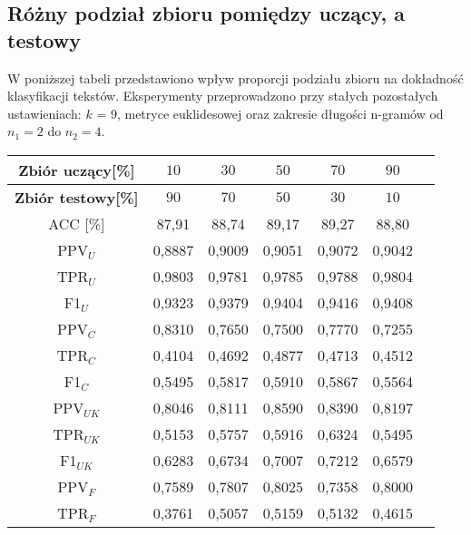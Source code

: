 \documentclass{article}
\begin{document}

\subsection{Różny podział zbioru pomiędzy uczący, a testowy}
W poniższej tabeli przedstawiono wpływ proporcji podziału zbioru na dokładność klasyfikacji tekstów. Eksperymenty przeprowadzono przy stałych pozostałych ustawieniach: \(k\) = 9, metryce euklidesowej oraz zakresie długości n-gramów od \(n_1 = 2\) do \(n_2 = 4\).

\begin{table}[H]
    \centering
    \begin{tabular}{|c|c|c|c|c|c|c}
    \hline
    \textbf{Zbiór uczący[\%]} & \textbf{\(10\)} & \textbf{\(30\)} & \textbf{\(50\)} & \textbf{\(70\)}  & \textbf{\(90\)} \\ \hline
    \textbf{Zbiór testowy[\%]} & \textbf{\(90\)} & \textbf{\(70\)} & \textbf{\(50\)} & \textbf{\(30\)}  & \textbf{\(10\)} \\ \hline
    ACC [\%] & 87,91 & 88,74 & 89,17 & 89,27 & 88,80\\ \hline
    PPV\(_U\) & 0,8887 & 0,9009 & 0,9051 & 0,9072 & 0,9042\\ \hline
    TPR\(_U\) & 0,9803 & 0,9781 & 0,9785 & 0,9788 & 0,9804\\ \hline
    F1\(_U\) & 0,9323 & 0,9379 & 0,9404 & 0,9416 & 0,9408\\ \hline
    PPV\(_C\) & 0,8310 & 0,7650 & 0,7500 & 0,7770 & 0,7255\\ \hline
    TPR\(_C\) & 0,4104 & 0,4692 & 0,4877 & 0,4713 & 0,4512\\ \hline
    F1\(_C\) & 0,5495 & 0,5817 & 0,5910 & 0,5867 & 0,5564\\ \hline
    PPV\(_{UK}\) & 0,8046 & 0,8111 & 0,8590& 0,8390 & 0,8197\\ \hline
    TPR\(_{UK}\) & 0,5153 & 0,5757 & 0,5916 & 0,6324 & 0,5495\\ \hline
    F1\(_{UK}\) & 0,6283 & 0,6734 & 0,7007 & 0,7212 & 0,6579\\ \hline
    PPV\(_F\) & 0,7589 & 0,7807 & 0,8025 & 0,7358 & 0,8000\\ \hline
    TPR\(_F\) & 0,3761 & 0,5057 & 0,5159 & 0,5132 & 0,4615\\ \hline

\end{tabular}
\end{table}
\end{document}

